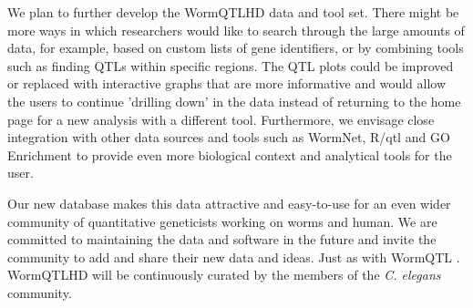 We plan to further develop the WormQTLHD data and tool set. There might be more ways in which 
researchers would like to search through the large amounts of data, for example, based on custom 
lists of gene identifiers, or by combining tools such as finding QTLs within specific regions. 
The QTL plots could be improved or replaced with interactive graphs that are more informative and 
would allow the users to continue 'drilling down' in the data instead of returning to the home page 
for a new analysis with a different tool. Furthermore, we envisage close integration with other data 
sources and tools such as WormNet, R/qtl and GO Enrichment to provide even more biological context 
and analytical tools for the user.

Our new database makes this data attractive and easy-to-use for an even wider community of quantitative 
geneticists working on worms and human. We are committed to maintaining the data and software in the 
future and invite the community to add and share their new data and ideas. Just as with WormQTL \cite{Snoek:2012}. 
WormQTLHD will be continuously curated by the members of the \emph{C. elegans} community. 

